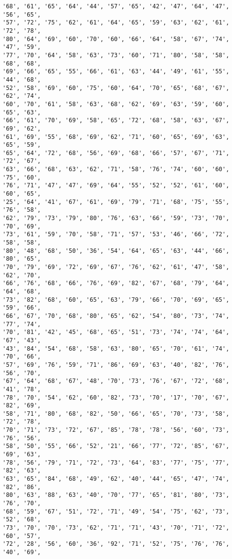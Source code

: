 \documentclass[11pt]{article}
\begin{document}
\begin{Verbatim}[commandchars=\\\{\}]
'68', '61', '65', '64', '44', '57', '65', '42', '47', '64', '47', '56', '65',
'57', '72', '75', '62', '61', '64', '65', '59', '63', '62', '61', '72', '78',
'80', '64', '69', '60', '70', '60', '66', '64', '58', '67', '74', '47', '59',
'77', '70', '64', '58', '63', '73', '60', '71', '80', '58', '58', '68', '68',
'69', '66', '65', '55', '66', '61', '63', '44', '49', '61', '55', '44', '68',
'52', '58', '69', '60', '75', '60', '64', '70', '65', '68', '67', '62', '74',
'60', '70', '61', '58', '63', '68', '62', '69', '63', '59', '60', '65', '63',
'66', '61', '70', '69', '58', '65', '72', '68', '58', '63', '67', '69', '62',
'61', '69', '55', '68', '69', '62', '71', '60', '65', '69', '63', '65', '59',
'65', '64', '72', '68', '56', '69', '68', '66', '57', '67', '71', '72', '67',
'63', '66', '68', '63', '62', '71', '58', '76', '74', '60', '60', '75', '60',
'76', '71', '47', '47', '69', '64', '55', '52', '52', '61', '60', '60', '65',
'25', '64', '41', '67', '61', '69', '79', '71', '68', '75', '55', '76', '58',
'62', '79', '73', '79', '80', '76', '63', '66', '59', '73', '70', '70', '69',
'73', '61', '59', '70', '58', '71', '57', '53', '46', '66', '72', '58', '58',
'80', '48', '68', '50', '36', '54', '64', '65', '63', '44', '66', '80', '65',
'70', '79', '69', '72', '69', '67', '76', '62', '61', '47', '58', '62', '70',
'66', '76', '68', '66', '76', '69', '82', '67', '68', '79', '64', '64', '68',
'73', '82', '68', '60', '65', '63', '79', '66', '70', '69', '65', '59', '66',
'66', '67', '70', '68', '80', '65', '62', '54', '80', '73', '74', '77', '74',
'70', '81', '42', '45', '68', '65', '51', '73', '74', '74', '64', '67', '43',
'43', '84', '54', '68', '58', '63', '80', '65', '70', '61', '74', '70', '66',
'57', '69', '76', '59', '71', '86', '69', '63', '40', '82', '76', '56', '70',
'67', '64', '68', '67', '48', '70', '73', '76', '67', '72', '68', '41', '78',
'78', '70', '54', '62', '60', '82', '73', '70', '17', '70', '67', '82', '69',
'58', '71', '80', '68', '82', '50', '66', '65', '70', '73', '58', '72', '78',
'70', '71', '73', '72', '67', '85', '78', '78', '56', '60', '73', '76', '56',
'58', '50', '55', '66', '52', '21', '66', '77', '72', '85', '67', '69', '63',
'78', '56', '79', '71', '72', '73', '64', '83', '77', '75', '77', '82', '63',
'63', '65', '84', '68', '49', '62', '40', '44', '65', '47', '74', '82', '86',
'80', '63', '88', '63', '40', '70', '77', '65', '81', '80', '73', '76', '70',
'68', '59', '67', '51', '72', '71', '49', '54', '75', '62', '73', '52', '68',
'73', '70', '70', '73', '62', '71', '71', '43', '70', '71', '72', '60', '57',
'72', '28', '56', '60', '36', '92', '71', '52', '75', '76', '76', '40', '69',

\end{Verbatim}
\end{document}
